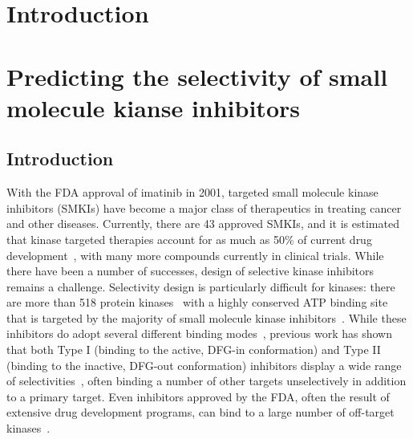 \documentclass[phd,tocprelim]{cornell}
\begin{document}
\contentspage
\tablelistpage
\figurelistpage


\normalspacing \setcounter{page}{1} 
\pagestyle{cornell} \addtolength{\parskip}{0.5\baselineskip}

\chapter{Introduction}
\chapter{Predicting the selectivity of small molecule kianse inhibitors}
\section{Introduction}
With the FDA approval of imatinib in 2001, targeted small molecule kinase inhibitors (SMKIs) have become a major class of therapeutics in treating cancer and other diseases. Currently, there are 43\citep{fda-approved-kinase-inhibitors} approved SMKIs, and it is estimated that kinase targeted therapies account for as much as 50\% of current drug development~\citep{Santos:Nat.Rev.DrugDiscov.:2016}, with many more compounds currently in clinical trials. While there have been a number of successes, design of selective kinase inhibitors remains a challenge. Selectivity design is particularly difficult for kinases: there are more than 518 protein kinases~\citep{Volkamer2015-jx,Manning2002-cw} with a highly conserved ATP binding site that is targeted by the majority of small molecule kinase inhibitors~\citep{Wu2015-oq}. While these inhibitors do adopt several different binding modes~\citep{Cowan-Jacob2007-rn,Seeliger2007-jn,Huse2002-ml,Harrison2003-ct}, previous work has shown that both Type I (binding to the active, DFG-in conformation) and Type II (binding to the inactive, DFG-out conformation) inhibitors display a wide range of selectivities~\citep{Anastassiadis2011-sm,Davis:Nat.Biotechnol.:2011}, often binding a number of other targets unselectively in addition to a primary target. Even inhibitors approved by the FDA, often the result of extensive drug development programs, can bind to a large number of off-target kinases~\citep{Klaeger2017-jr}.
\end{document}
